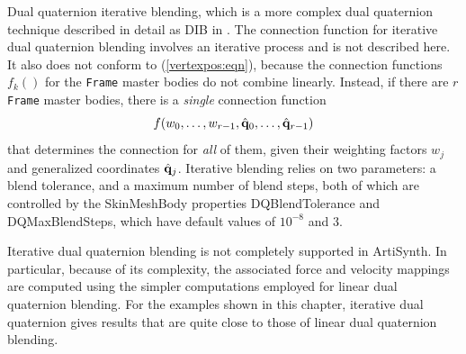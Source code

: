 \begin{description}
Dual quaternion iterative blending, which is a more complex dual
quaternion technique described in detail as DIB in
\cite{kavan2008geometric}. The connection function for iterative dual
quaternion blending involves an iterative process and is not
described here. It also does not conform to (\ref{vertexpos:eqn}),
because the connection functions $f_k()$ for the {\tt Frame} master
bodies do not combine linearly. Instead, if there
are $r$ {\tt Frame} master bodies, there is a {\it single}
connection function
%
\begin{equation}
f (w_0, \ldots, w_{r-1}, \hat{{\bf q}}_0, \ldots, \hat{{\bf q}}_{r-1})
\end{equation}
%
that determines the connection for {\it all} of them, given their
weighting factors $w_j$ and generalized coordinates $\hat{{\bf q}}_j$.
Iterative blending relies on two parameters: a blend tolerance, and a
maximum number of blend steps, both of which are controlled by the
SkinMeshBody properties {\sf DQBlendTolerance} and {\sf
DQMaxBlendSteps}, which have default values of $10^{-8}$ and $3$.

\begin{sideblock}
Iterative dual quaternion blending is not completely supported in
ArtiSynth. In particular, because of its complexity, the associated
force and velocity mappings are computed using the simpler
computations employed for linear dual quaternion blending.  For the
examples shown in this chapter, iterative dual quaternion gives
results that are quite close to those of linear dual quaternion
blending.
\end{sideblock}

\end{description}

